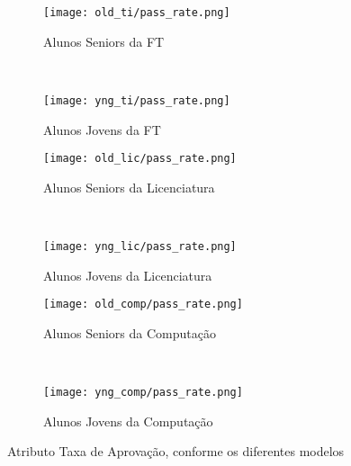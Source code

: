 \clearpage
\begin{figure}[!ht]
    \centering
    \begin{subfigure}[b]{0.48\textwidth}
        \centering
        \texttt{[image: old\_ti/pass\_rate.png]}
        \caption{Alunos Seniors da FT}
    \end{subfigure}
    ~
    \begin{subfigure}[b]{0.48\textwidth}
        \centering
        \texttt{[image: yng\_ti/pass\_rate.png]}
        \caption{Alunos Jovens da FT}
    \end{subfigure}

    \begin{subfigure}[b]{0.48\textwidth}
        \centering
        \texttt{[image: old\_lic/pass\_rate.png]}
        \caption{Alunos Seniors da Licenciatura}
    \end{subfigure}
    ~
    \begin{subfigure}[b]{0.48\textwidth}
        \centering
        \texttt{[image: yng\_lic/pass\_rate.png]}
        \caption{Alunos Jovens da Licenciatura}
    \end{subfigure}

    \begin{subfigure}[b]{0.48\textwidth}
        \centering
        \texttt{[image: old\_comp/pass\_rate.png]}
        \caption{Alunos Seniors da Computação}
    \end{subfigure}
    ~
    \begin{subfigure}[b]{0.48\textwidth}
        \centering
        \texttt{[image: yng\_comp/pass\_rate.png]}
        \caption{Alunos Jovens da Computação}
    \end{subfigure}
    \caption{Atributo Taxa de Aprovação, conforme os diferentes modelos}
\end{figure}

